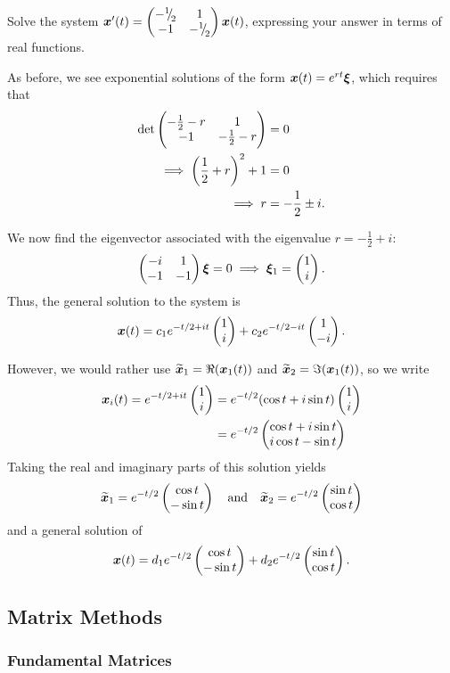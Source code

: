 \begin{eg}
	Solve the system $\bm{x}'(t) = \begin{pmatrix}-{}^{1}{\mskip -5mu/\mskip -3mu}_{2} & 1 \\ -1 & -{}^{1}{\mskip -5mu/\mskip -3mu}_{2}\end{pmatrix} \bm{x}(t)$, expressing your answer in terms of real functions.
	
	As before, we see exponential solutions of the form $\bm{x}(t) = e^{rt} \bm{\xi}$, which requires that
	\begin{align*}
		\det \begin{pmatrix}-\frac12 -r & 1 \\ -1 & -\frac12 -r\end{pmatrix} &= 0 \\
		\implies \left(\frac12 + r\right)^2 + 1 &= 0 \\
		\implies r &= -\frac12 \pm i.
	\end{align*}
	
	We now find the eigenvector associated with the eigenvalue $r = -\frac12 + i$:
	\[
	\begin{pmatrix}-i & 1 \\ -1 & -1\end{pmatrix}\bm{\xi} = 0 \implies \bm{\xi}_1 = \begin{pmatrix}1 \\ i\end{pmatrix}.
	\]
	Thus, the general solution to the system is
	\[
	\bm{x}(t) = c_1 e^{-t/2 + it}\begin{pmatrix}1 \\ i\end{pmatrix} + c_2 e^{-t/2 - it}\begin{pmatrix}1 \\ -i\end{pmatrix}.
	\]
	
	However, we would rather use $\widetilde{\bm{x}}_1 = \Re(\bm{x}_1(t))$ and $\widetilde{\bm{x}}_2 = \Im(\bm{x}_1(t))$, so we write
	\begin{align*}
		\bm{x}_i(t) = e^{-t/2 + it}\begin{pmatrix}1 \\ i\end{pmatrix} &= e^{-t/2}(\cos t + i\sin t)\begin{pmatrix}1 \\ i\end{pmatrix} \\
		&= e^{-t/2}\begin{pmatrix}\cos t + i\sin t \\ i\cos t -\sin t\end{pmatrix}
	\end{align*}
	Taking the real and imaginary parts of this solution yields
	\[
	\widetilde{\bm{x}}_1 = e^{-t/2}\begin{pmatrix}\cos t \\ -\sin t\end{pmatrix} \quad\text{and}\quad \widetilde{\bm{x}}_2 = e^{-t/2}\begin{pmatrix}\sin t \\ \cos t\end{pmatrix}
	\]
	and a general solution of
	\[
	\bm{x}(t) = d_1 e^{-t/2}\begin{pmatrix}\cos t \\ -\sin t\end{pmatrix} + d_2 e^{-t/2}\begin{pmatrix}\sin t \\ \cos t\end{pmatrix}.
	\]
\end{eg}


\subsection{Matrix Methods}

\subsubsection{Fundamental Matrices}

